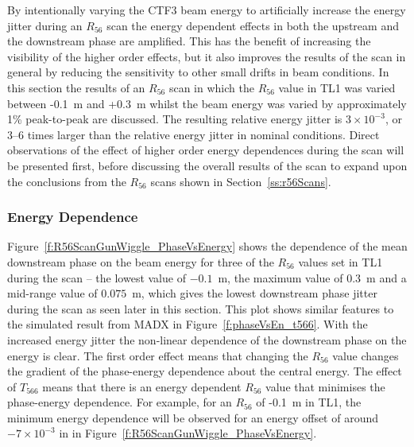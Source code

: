 By intentionally varying the CTF3 beam energy to artificially increase the energy jitter during an \(R_{56}\) scan the energy dependent effects in both the upstream and the downstream phase are amplified. This has the benefit of increasing the visibility of the higher order effects, but it also improves the results of the scan in general by reducing the sensitivity to other small drifts in beam conditions. In this section the results of an \(R_{56}\) scan in which the \(R_{56}\) value in TL1 was varied between -0.1~m and +0.3~m whilst the beam energy was varied by approximately 1\% peak-to-peak are discussed. The resulting relative energy jitter is \(3\times10^{-3}\), or 3--6 times larger than the relative energy jitter in nominal conditions. Direct observations of the effect of higher order energy dependences during the scan will be presented first, before discussing the overall results of the scan to expand upon the conclusions from the \(R_{56}\) scans shown in Section~\ref{ss:r56Scans}.

\subsubsection{Energy Dependence}


Figure~\ref{f:R56ScanGunWiggle_PhaseVsEnergy} shows the dependence of the mean downstream phase on the beam energy for three of the \(R_{56}\) values set in TL1 during the scan -- the lowest value of \(-0.1\)~m, the maximum value of \(0.3\)~m and a mid-range value of \(0.075\)~m, which gives the lowest downstream phase jitter during the scan as seen later in this section. This plot shows similar features to the simulated result from MADX in Figure~\ref{f:phaseVsEn_t566}. With the increased energy jitter the non-linear dependence of the downstream phase on the energy is clear. The first order effect means that changing the \(R_{56}\) value changes the gradient of the phase-energy dependence about the central energy. The effect of \(T_{566}\) means that there is an energy dependent \(R_{56}\) value that minimises the phase-energy dependence. For example, for an \(R_{56}\) of -0.1~m in TL1, the minimum energy dependence will be observed for an energy offset of around \(-7\times10^{-3}\) in in Figure~\ref{f:R56ScanGunWiggle_PhaseVsEnergy}.


